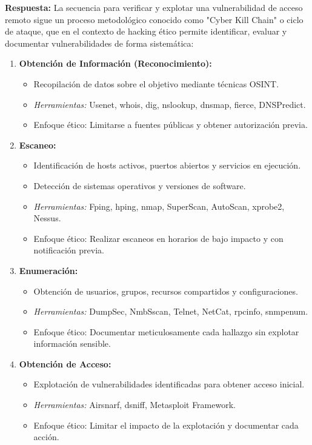 {\textbf{Respuesta:}
La secuencia para verificar y explotar una vulnerabilidad de acceso remoto sigue un proceso metodológico conocido como "Cyber Kill Chain" o ciclo de ataque, que en el contexto de hacking ético permite identificar, evaluar y documentar vulnerabilidades de forma sistemática:

\begin{enumerate}
    \item \textbf{Obtención de Información (Reconocimiento):} 
    \begin{itemize}
        \item Recopilación de datos sobre el objetivo mediante técnicas OSINT.
        \item \textit{Herramientas:} Usenet, whois, dig, nslookup, dnsmap, fierce, DNSPredict.
        \item Enfoque ético: Limitarse a fuentes públicas y obtener autorización previa.
    \end{itemize}

    \item \textbf{Escaneo:} 
    \begin{itemize}
        \item Identificación de hosts activos, puertos abiertos y servicios en ejecución.
        \item Detección de sistemas operativos y versiones de software.
        \item \textit{Herramientas:} Fping, hping, nmap, SuperScan, AutoScan, xprobe2, Nessus.
        \item Enfoque ético: Realizar escaneos en horarios de bajo impacto y con notificación previa.
    \end{itemize}

    \item \textbf{Enumeración:} 
    \begin{itemize}
        \item Obtención de usuarios, grupos, recursos compartidos y configuraciones.
        \item \textit{Herramientas:} DumpSec, NmbSscan, Telnet, NetCat, rpcinfo, snmpenum.
        \item Enfoque ético: Documentar meticulosamente cada hallazgo sin explotar información sensible.
    \end{itemize}

    \item \textbf{Obtención de Acceso:} 
    \begin{itemize}
        \item Explotación de vulnerabilidades identificadas para obtener acceso inicial.
        \item \textit{Herramientas:} Airsnarf, dsniff, Metasploit Framework.
        \item Enfoque ético: Limitar el impacto de la explotación y documentar cada acción.
    \end{itemize}


\end{enumerate}}
